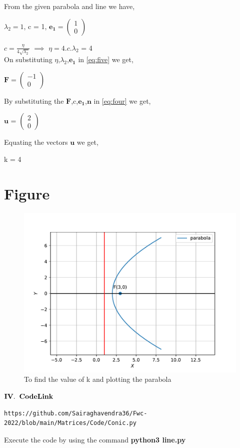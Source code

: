 \documentclass[journal,12pt,twocolumn]{IEEEtran}
\newcommand{\myvec}[1]{\ensuremath{\begin{pmatrix}#1\end{pmatrix}}}
\let\vec\mathbf
\begin{document}
From the given parabola and line we have,
\begin{center}
$\lambda_2 =1$, c = 1, $\vec{e_1} = \myvec{1 \\ 0}$
\end{center}


$c = \frac{\eta}{4\sqrt{\lambda_2}}$ $\implies$ $\eta = 4.c.\lambda_2$ = 4\\

On substituting $\eta$,$\lambda_2$,$\vec{e_1}$ in \eqref{eq:five} we get,

\begin{center}
$\vec{F} = \myvec{-1 \\ 0}$
\end{center}

By substituting the $\vec{F}$,c,$\vec{e_1}$,$\vec{n}$ in \eqref{eq:four} we get,
\begin{center}
$\vec{u}$ = $\myvec{2 \\ 0}$
\end{center} 

Equating the vectors $\vec{u}$ we get,

\begin{center}
k = 4
\end{center}


\section{Figure}
\begin{figure}[h]
\includegraphics[width=\columnwidth]{fig.pdf}
\caption{To find the value of k and plotting the parabola}
    \label{fig:my_label}
\end{figure}


\begin{center}
$\vec{IV.\hspace{.2cm} Code Link}$
\end{center}
\begin{lstlisting}
https://github.com/Sairaghavendra36/Fwc-2022/blob/main/Matrices/Code/Conic.py
\end{lstlisting}
Execute the code by using the command
\textbf{python3 line.py}
\end{document}
